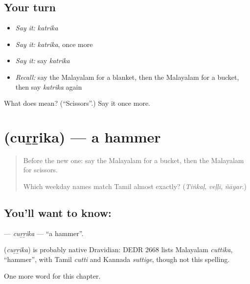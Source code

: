 \subsection*{Your turn}
\begin{itemize}
\raggedright
  \item \emph{Say it:} \emph{katrika}
  \item \emph{Say it:} \emph{katrika}, once more
  \item \emph{Say it:} say \emph{katrika}
  \item \emph{Recall:} say the Malayalam for a blanket, then the Malayalam for a bucket, then say \emph{katrika} again
\end{itemize}

\begin{tcolorbox}[breakable,colback=teal!4,colframe=teal!35!black,title={Before you move on}]
What does  mean? (\textquotedblleft{}Scissors\textquotedblright{}.) Say it once more.
\end{tcolorbox}
\section[\texorpdfstring{\ml{ചുറ്റിക} (cuṟṟika)}{ചുറ്റിക (cuṟṟika)}]{ (cuṟṟika) — a hammer}

\label{lesson:ML-C159-currika}



\begin{quote}
Before the new one: say the Malayalam for a bucket, then the Malayalam for scissors.

Which weekday names match Tamil almost exactly? (\emph{Tiṅkaḷ}, \emph{veḷḷi}, \emph{ñāyar}.)
\end{quote}

\subsection*{You'll want to know: }
\textbf{} — \emph{cuṟṟika} — \textquotedblleft{}a hammer\textquotedblright{}.

\begin{cousinweb}
\textbf{} (\emph{cuṟṟika}) is probably native Dravidian: DEDR 2668 lists Malayalam \emph{cuttika}, \textquotedblleft{}hammer\textquotedblright{}, with Tamil \emph{cutti} and Kannada \emph{suttige}, though not this spelling.
\end{cousinweb}

\begin{grammarlens}[title={What you've built}]
One more word for this chapter.
\end{grammarlens}

